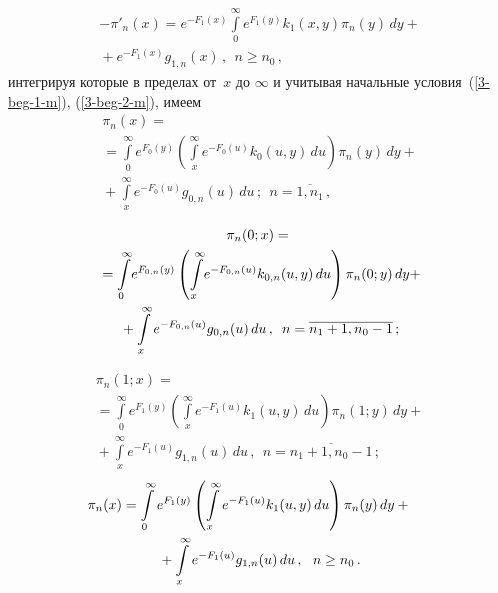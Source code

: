 \begin{multicols}{2}
\vspace*{-12pt}

\noindent
\begin{multline}
\label{pi-4-m}
-\pi'_n(x) = e^{-F_{1}(x)} \int\limits_0^\infty e^{F_{1}(y)} k_{1}(x,y)\pi_n(y)\, dy
+{}\\
{}+
e^{-F_{1}(x)} g_{1,n}(x) \,, \ \ n\ge n_0\,,
\end{multline}
интегрируя которые в пределах от~$x$ до $\infty$
и учитывая начальные условия~(\ref{3-beg-1-m}),
(\ref{3-beg-2-m}), имеем
\begin{multline}
\label{int-1-m}
\pi_n(x) ={}\\
{}= \int\limits_0^\infty e^{F_0(y)} \left(
\int\limits_x^\infty e^{-F_0(u)} k_0(u,y)\, du
\right) \pi_n(y)\, dy
+{}\\
{}+
\int\limits_x^\infty e^{-F_0(u)} g_{0,n}(u)\, du\,;
\ \ n=\overline{1,n_1}\,,
\end{multline}

\vspace*{-12pt}

\noindent
\begin{multline}
\label{int-2-m}
\pi_n(0;x) ={}\\
{}= \int\limits_0^\infty\! e^{F_{0,n}(y)} \left(
\int\limits_x^\infty\! e^{-F_{0,n}(u)} k_{0,n}(u,y)\, du \right)
\pi_n(0;y)\, dy+
\\
{}+
\int\limits_x^\infty e^{-F_{0,n}(u)} g_{0,n}(u)\, du\,,
\enskip n=\overline{n_1+1,n_0-1}\,;
\end{multline}


\vspace*{-12pt}

\noindent
\begin{multline}
\label{int-3-m}
\pi_n(1;x) ={}\\
{}= \int\limits_0^\infty e^{F_{1}(y)} \left(
\int\limits_x^\infty e^{-F_{1}(u)} k_{1}(u,y)\, du\right)
\pi_n(1;y)\, dy
+{}
\\
{}+
\int\limits_x^\infty e^{-F_{1}(u)} g_{1,n}(u)\, du\,,
\ \ n=\overline{n_1+1,n_0-1}\,;
\end{multline}
\begin{multline}
\label{int-4-m}
\hspace*{-5mm}\pi_n(x) = \int\limits_0^\infty e^{F_{1}(y)} \left(
\int\limits_x^\infty e^{-F_{1}(u)} k_{1}(u,y)\, du \right)
\pi_n(y)\, dy +{}\\
{}+
\int\limits_x^\infty e^{-F_{1}(u)} g_{1,n}(u)\, du\,,
\ \ n\ge n_0\,.
\end{multline}


\end{multicols}
